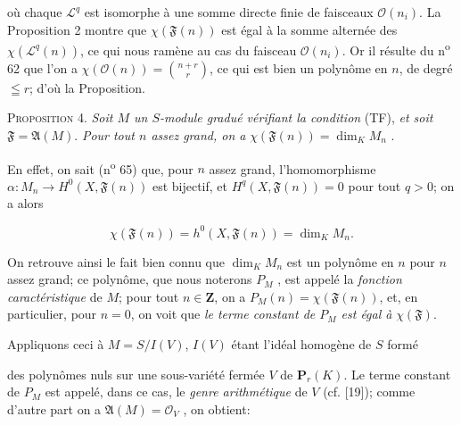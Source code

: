 où chaque $\mathcal{L}^q$ est isomorphe à une somme directe finie de faisceaux $\mathcal{O}(n_i)$. La Proposition 2 montre que $\chi(\mathfrak{F}(n))$ est égal à la somme alternée des $\chi(\mathcal{L}^q(n))$, ce qui nous ramène au cas du faisceau $\mathcal{O}(n_i)$. Or il résulte du n\textsuperscript{o} 62 que l'on a $\chi(\mathcal{O}(n)) = \binom{n + r}{r}$, ce qui est bien un polynôme en $n$, de degré $\leqq r$; d'où la Proposition.

\textsc{Proposition} 4. \textit{Soit $M$ un $S$-module gradué vérifiant la condition} (TF), \textit{et soit} $\mathfrak{F} = \mathfrak{A}(M)$. \textit{Pour tout $n$ assez grand, on a} $\chi(\mathfrak{F}(n)) = \dim_K M_n$ .

En effet, on sait (n\textsuperscript{o} 65) que, pour $n$ assez grand, l'homomorphisme $\alpha: M_n \rightarrow H^0(X, \mathfrak{F}(n))$ est bijectif, et $H^q(X, \mathfrak{F}(n)) = 0$ pour tout $q > 0$; on a alors

\begin{equation*}
\chi(\mathfrak{F}(n)) = h^0(X, \mathfrak{F}(n)) = \dim_K M_n .
\end{equation*}

On retrouve ainsi le fait bien connu que $\dim_K M_n$ est un polynôme en $n$ pour $n$ assez grand; ce polynôme, que nous noterons $P_M$ , est appelé la \textit{fonction caractéristique} de $M$; pour tout $n \in \mathbf{Z}$, on a $P_M(n) = \chi(\mathfrak{F}(n))$, et, en particulier, pour $n = 0$, on voit que \textit{le terme constant de $P_M$ est égal à} $\chi(\mathfrak{F})$.

Appliquons ceci à $M = S/I(V)$, $I(V)$ étant l'idéal homogène de $S$ formé



%
%
%
des polynômes nuls sur une sous-variété fermée $V$ de $\mathbf{P}_r(K)$. Le terme constant de $P_M$ est appelé, dans ce cas, le \textit{genre arithmétique} de $V$ (cf. [19]); comme d'autre part on a $\mathfrak{A}(M) = \mathcal{O}_V$ , on obtient:

